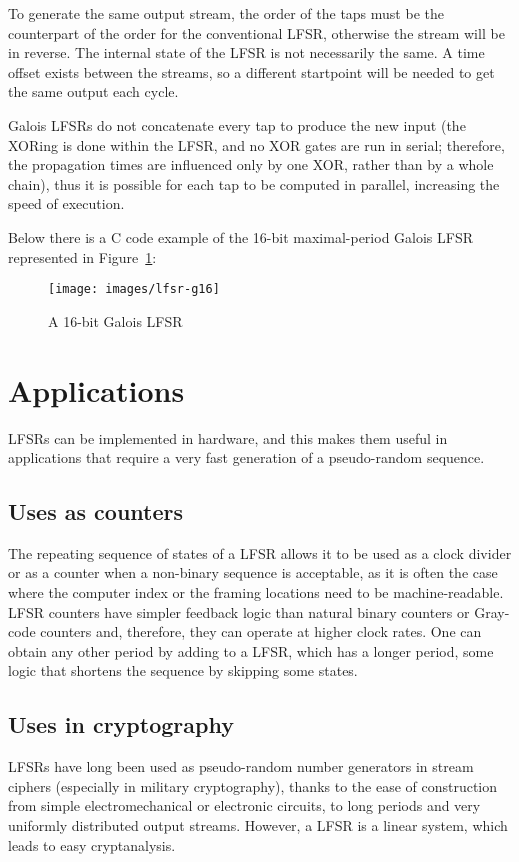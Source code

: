 \documentclass[11pt,a4paper,oneside, openright]{article}
\begin{document}
To generate the same output stream, the order of the taps must be the counterpart of the order for the conventional LFSR, otherwise the stream will be in reverse. The internal state of the LFSR is not necessarily the same. A time offset exists between the streams, so a different startpoint will be needed to get the same output each cycle.

Galois LFSRs do not concatenate every tap to produce the new input (the XORing is done within the LFSR, and no XOR gates are run in serial; therefore, the propagation times are influenced only by one XOR, rather than by a whole chain), thus it is possible for each tap to be computed in parallel, increasing the speed of execution.

Below there is a C code example of the 16-bit maximal-period Galois LFSR represented in Figure~\ref{fig:lfsr-g16}:



\begin{figure}
    \centering
    \texttt{[image: images/lfsr-g16]}
    \caption{A 16-bit Galois LFSR}
    \label{fig:lfsr-g16}
\end{figure}

\section{Applications}
LFSRs can be implemented in hardware, and this makes them useful in applications \cite{lfsr} that require a very fast generation of a pseudo-random sequence.

\subsection{Uses as counters}
The repeating sequence of states of a LFSR allows it to be used as a clock divider or as a counter when a non-binary sequence is acceptable, as it is often the case where the computer index or the framing locations need to be machine-readable. LFSR counters have simpler feedback logic than natural binary counters or Gray-code counters and, therefore, they can operate at higher clock rates. One can obtain any other period by adding to a LFSR, which has a longer period, some logic that shortens the sequence by skipping some states.

\subsection{Uses in cryptography}
LFSRs have long been used as pseudo-random number generators in stream ciphers (especially in military cryptography), thanks to the ease of construction from simple electromechanical or electronic circuits, to long periods and very uniformly distributed output streams. However, a LFSR is a linear system, which leads to easy cryptanalysis.
\end{document}
